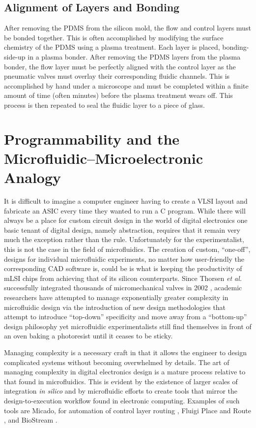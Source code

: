 \subsection{Alignment of Layers and Bonding}
After removing the PDMS from the silicon mold, the flow and control layers must be bonded together. This is often accomplished by modifying the surface chemistry of the PDMS using a plasma treatment. Each layer is placed, bonding-side-up in a plasma bonder. After removing the PDMS layers from the plasma bonder, the flow layer must be perfectly aligned with the control layer as the pneumatic valves must overlay their corresponding fluidic channels. This is accomplished by hand under a microscope and must be completed within a finite amount of time (often minutes) before the plasma treatment wears off. This process is then repeated to seal the fluidic layer to a piece of glass. 

\section{Programmability and the Microfluidic--Microelectronic Analogy}
\label{sec:backgroundCFRouting}

It is difficult to imagine a computer engineer having to create a VLSI layout and fabricate an ASIC every time they wanted to run a C program. While there will always be a place for custom circuit design in the world of digital electronics one basic tenant of digital design, namely abstraction, requires that it remain very much the exception rather than the rule. Unfortunately for the experimentalist, this is not the case in the field of microfluidics. The creation of custom, ``one-off'', designs for individual microfluidic experiments, no matter how user-friendly the corresponding CAD software is, could be is what is keeping the productivity of mLSI chips from achieving that of its silicon counterparts. Since Thorsen \emph{et al.} successfully integrated thousands of micromechanical valves in 2002 \cite{thorsen2002}, academic researchers have attempted to manage exponentially greater complexity in microfluidic design via the introduction of new design methodologies that attempt to introduce ``top-down'' specificity and move away from a ``bottom-up'' design philosophy \cite{minhass2013}\cite{melin2007}\cite{minhass2012} yet microfluidic experimentalists still find themselves in front of an oven baking a photoresist until it ceases to be sticky. 

Managing complexity is a necessary craft in that it allows the engineer to design complicated systems without becoming overwhelmed by details. The art of managing complexity in digital electronics design is  a mature process relative to that found in microfluidics. This is evident by the existence of larger scales of integration \emph{in silico} and by microfluidic efforts to create tools that mirror the design-to-execution workflow found in electronic computing. Examples of such tools are Micado, for automation of control layer routing \cite{amin2009}, Fluigi Place and Route \cite{fluigi}, and BioStream \cite{thies2008}. 

